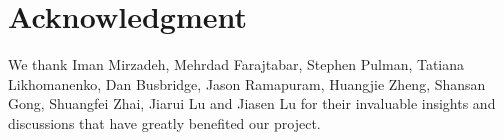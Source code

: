 \section*{Acknowledgment}
We thank Iman Mirzadeh, Mehrdad Farajtabar, Stephen Pulman, Tatiana Likhomanenko, Dan Busbridge, Jason Ramapuram, Huangjie Zheng, Shansan Gong, Shuangfei Zhai, Jiarui Lu and Jiasen Lu for their invaluable insights and discussions that have greatly benefited our project.